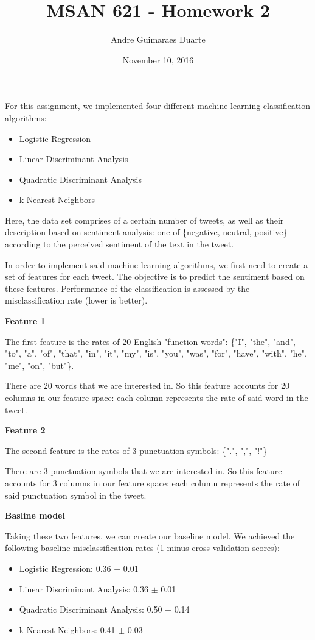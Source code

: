 \documentclass[]{article}
\title{MSAN 621 - Homework 2}
\author{Andre Guimaraes Duarte}
\date{November 10, 2016}
\begin{document}
\maketitle

For this assignment, we implemented four different machine learning classification algorithms:

\begin{itemize}
  \item Logistic Regression
  \item Linear Discriminant Analysis
  \item Quadratic Discriminant Analysis
  \item k Nearest Neighbors
\end{itemize}

Here, the data set comprises of a certain number of tweets, as well as their description based on sentiment analysis: one of \{negative, neutral, positive\} according to the perceived sentiment of the text in the tweet. 

In order to implement said machine learning algorithms, we first need to create a set of features for each tweet. The objective is to predict the sentiment based on these features. Performance of the classification is assessed by the misclassification rate (lower is better).

\textbf{Feature 1}

The first feature is the rates of 20 English "function words": \{"I", "the", "and", "to", "a", "of", "that", "in", "it", "my", "is", "you", "was", "for", "have", "with", "he", "me", "on", "but"\}.

There are 20 words that we are interested in. So this feature accounts for 20 columns in our feature space: each column represents the rate of said word in the tweet.

\textbf{Feature 2}

The second feature is the rates of 3 punctuation symbols: \{".", ",", "!"\}

There are 3 punctuation symbols that we are interested in. So this feature accounts for 3 columns in our feature space: each column represents the rate of said punctuation symbol in the tweet.

\textbf{Basline model}

Taking these two features, we can create our baseline model. We achieved the following baseline misclassification rates (1 minus cross-validation scores):

\begin{itemize}
  \item Logistic Regression: 0.36 $\pm$ 0.01
  \item Linear Discriminant Analysis: 0.36 $\pm$ 0.01
  \item Quadratic Discriminant Analysis: 0.50 $\pm$ 0.14
  \item k Nearest Neighbors: 0.41 $\pm$ 0.03
\end{itemize}
\end{document}
